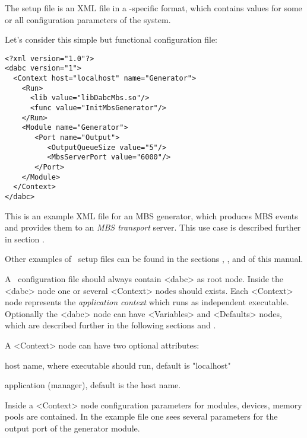 
The setup file is an XML file in a \dabc-specific format, 
which contains values for some or all configuration parameters of the system. 

Let's consider this simple but functional configuration file:

\begin{small}
\begin{verbatim}
<?xml version="1.0"?>
<dabc version="1">
  <Context host="localhost" name="Generator">
    <Run>
      <lib value="libDabcMbs.so"/>
      <func value="InitMbsGenerator"/>
    </Run>
    <Module name="Generator">
       <Port name="Output">
          <OutputQueueSize value="5"/>
          <MbsServerPort value="6000"/>
       </Port>
    </Module>
  </Context>
</dabc>
\end{verbatim}
\end{small}

This is an example XML file for an MBS generator, which produces 
MBS events and provides them to an {\em MBS transport} server. 
This use case is described further in section .

Other examples of \dabc\ setup files can be found in the sections
, , and 
of this manual.


A \dabc\ configuration file should always contain <dabc> as root node. 
Inside the <dabc> node one or several <Context> nodes should exists.
Each <Context> node represents the {\em application context} which runs as
independent executable. 
Optionally the <dabc> node can have <Variables> and <Defaults> nodes, 
which are described further in the following sections  
and .

A <Context> node can have two optional attributes:
\bdes
\item["host"] host name, where executable should run, default is "localhost"
\item["name"] application (manager), default is the host name.
\edes

Inside a <Context> node configuration parameters for modules, devices, memory pools are
contained.
In the example file one sees several parameters for the output port of 
the generator module.  

